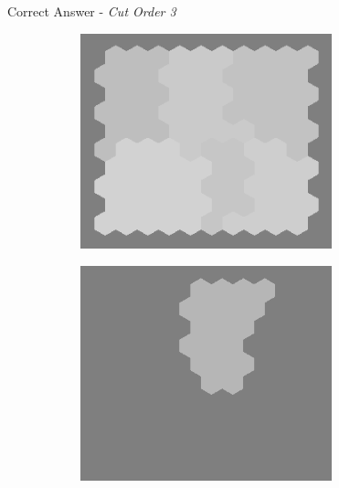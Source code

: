 \documentclass[10pt,xcolor=svgnames]{beamer} %
\begin{document}
\begin{frame}[standout]{Correct Answer - \textit{Cut Order 3}}
    \begin{figure}
        \centering
        \begin{subfigure}{0.4\textwidth}
        \centering
            \includegraphics[width=0.8\textwidth]{pictures/grid_init4.png}
        \end{subfigure}
        \hfill
        \begin{subfigure}{0.4\textwidth}
            \centering
            \includegraphics[width=0.8\textwidth]{pictures/seg_4_cut3.png}
        \end{subfigure}
    \end{figure}
\end{frame}
\end{document}
